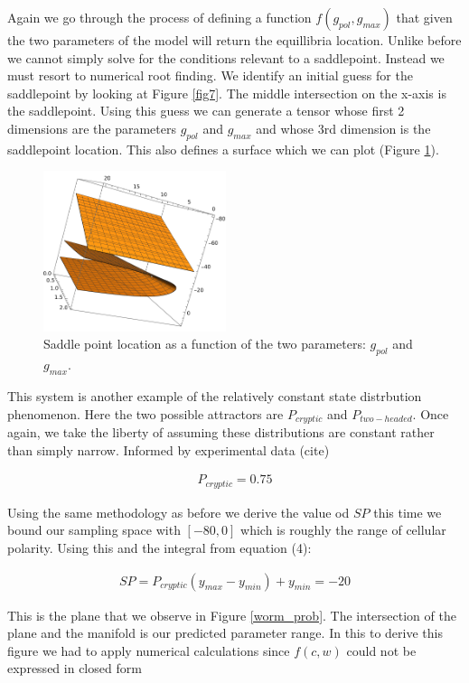 \documentclass[letterpaper]{article}
\begin{document}
Again we go through the process of defining a function $f(g_{pol},g_{max})$ that
given the two parameters of the model will return the equillibria location. Unlike 
before we cannot simply solve for the conditions relevant to a saddlepoint. Instead
we must resort to numerical root finding. We identify an initial guess for the 
saddlepoint 
by looking at Figure \ref{fig7}. The middle intersection on the x-axis is the 
saddlepoint.
Using this guess we can generate a tensor whose first 2 dimensions are the parameters 
$g_{pol}$ and $g_{max}$ and whose 3rd dimension is the saddlepoint location. This also
defines a surface which we can plot (Figure \ref{worm_sp}).

\begin{figure}[t]
\begin{center}
\includegraphics[width=2.1in,angle=0]{./worm_saddle.png}
\caption{Saddle point location as a function of the two parameters: 
$g_{pol}$ and $g_{max}$.}
\label{worm_sp}
\end{center}
\end{figure}

This system is another example of the relatively constant state distrbution phenomenon.
Here the two possible attractors are $P_{cryptic}$ and $P_{two-headed}$. Once again,
we take the liberty of assuming these distributions are constant rather than simply 
narrow. Informed by experimental data (cite)

\begin{eqnarray}
  P_{cryptic} = 0.75
\end{eqnarray}

Using the same methodology as before we derive the value od $SP$ this time we bound
our sampling space with $[-80,0]$ which is roughly the range of cellular polarity. 
Using this and the integral from equation (4):

\begin{eqnarray}
  SP = P_{cryptic}(y_{max}-y_{min}) + y_{min} = -20
\end{eqnarray}

This is the plane that we observe in Figure \ref{worm_prob}. The intersection
of the plane and the manifold is our predicted parameter range. In this to derive
this figure we had to apply numerical calculations since $f(c,w)$ could not be 
expressed in closed form
\end{document}
